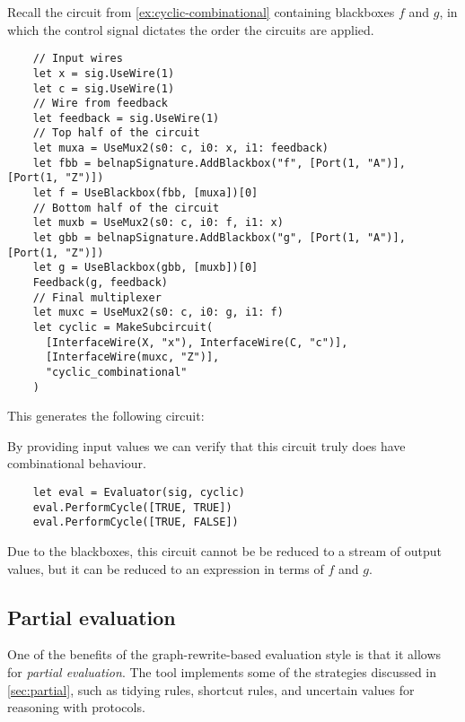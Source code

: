 \begin{example}
  Recall the circuit from \cref{ex:cyclic-combinational}
  containing blackboxes \(f\) and \(g\), in which the control signal
  dictates the order the circuits are applied.
  \begin{lstlisting}
    // Input wires
    let x = sig.UseWire(1)
    let c = sig.UseWire(1)
    // Wire from feedback
    let feedback = sig.UseWire(1)
    // Top half of the circuit
    let muxa = UseMux2(s0: c, i0: x, i1: feedback)
    let fbb = belnapSignature.AddBlackbox("f", [Port(1, "A")], [Port(1, "Z")])
    let f = UseBlackbox(fbb, [muxa])[0]
    // Bottom half of the circuit
    let muxb = UseMux2(s0: c, i0: f, i1: x)
    let gbb = belnapSignature.AddBlackbox("g", [Port(1, "A")], [Port(1, "Z")])
    let g = UseBlackbox(gbb, [muxb])[0]
    Feedback(g, feedback)
    // Final multiplexer
    let muxc = UseMux2(s0: c, i0: g, i1: f)
    let cyclic = MakeSubcircuit(
      [InterfaceWire(X, "x"), InterfaceWire(C, "c")],
      [InterfaceWire(muxc, "Z")],
      "cyclic_combinational"
    )
  \end{lstlisting}
  This generates the following circuit:
  \begin{center}
    
  \end{center}
  By providing input values we can verify that this circuit truly does have
  combinational behaviour.
  \begin{lstlisting}
    let eval = Evaluator(sig, cyclic)
    eval.PerformCycle([TRUE, TRUE])
    eval.PerformCycle([TRUE, FALSE])
  \end{lstlisting}
  Due to the blackboxes, this circuit cannot be be reduced to a stream of output
  values, but it can be reduced to an expression in terms of \(f\) and \(g\).
  \begin{center}
    
  \end{center}
\end{example}

\subsection{Partial evaluation}

One of the benefits of the graph-rewrite-based evaluation style is that it
allows for \emph{partial evaluation}.
The tool implements some of the strategies discussed in \cref{sec:partial}, such
as tidying rules, shortcut rules, and uncertain values for reasoning with
protocols.

